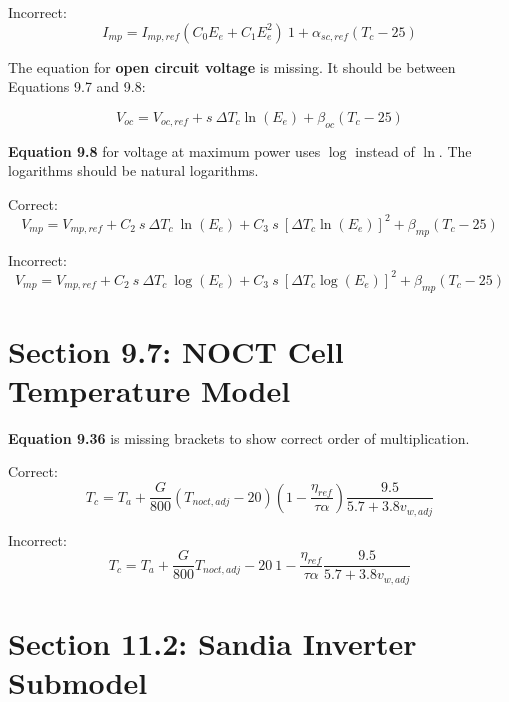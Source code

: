 \documentclass[report]{nrel}
\begin{document}
Incorrect:
\begin{equation*}
I_{mp} = I_{mp,ref} (C_0 E_e + C_1 E_e^2)~1 + \alpha_{sc,ref} (T_c - 25)
\end{equation*}

The equation for \textbf{open circuit voltage} is missing. It should be between Equations 9.7 and 9.8:

\begin{equation*}
V_{oc} = V_{oc,ref}+ s~\Delta T_c \ln(E_e)+ \beta_{oc} (T_c - 25)
\end{equation*}

\textbf{Equation 9.8} for voltage at maximum power uses $\log$ instead of $\ln$. The logarithms  should be natural logarithms.

Correct:
\begin{equation*}
V_{mp} = V_{mp,ref} +
 C_2~s~\Delta T_c~\ln(E_e) +
 C_3~s~\left[\Delta T_c \ln(E_e)\right]^2 +
 \beta_{mp} (T_c - 25)
\end{equation*}

Incorrect:
\begin{equation*}
V_{mp} = V_{mp,ref} +
 C_2~s~\Delta T_c~\log(E_e) +
 C_3~s~\left[\Delta T_c \log(E_e)\right]^2 +
 \beta_{mp} (T_c - 25)
\end{equation*}

\section*{Section 9.7: NOCT Cell Temperature Model}

\textbf{Equation 9.36} is missing brackets to show correct order of multiplication.

Correct:
\begin{equation*}
T_c = T_a + \frac{G}{800} \left(T_{noct,adj} - 20 \right) \left(1-\frac{\eta_{ref}}{\tau \alpha}\right) \frac{9.5}{5.7+3.8v_{w,adj}}
\end{equation*}

Incorrect:
\begin{equation*}
T_c = T_a + \frac{G}{800} T_{noct,adj} - 20~ 1-\frac{\eta_{ref}}{\tau \alpha} \frac{9.5}{5.7+3.8v_{w,adj}}
\end{equation*}

\section*{Section 11.2: Sandia Inverter Submodel}
\end{document}
